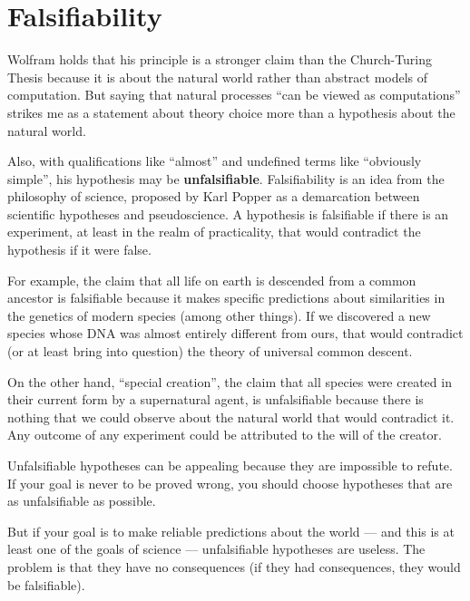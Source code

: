 \documentclass[12pt]{book}
\theoremstyle{exercise}
\begin{document}


\section{Falsifiability}

Wolfram holds that his principle is a stronger claim than the
Church-Turing Thesis because it is about the natural world rather
than abstract models of computation.  But saying that natural processes
``can be viewed as computations'' strikes me as a statement about
theory choice more than a hypothesis about the natural world.


Also, with qualifications like
``almost'' and undefined terms like ``obviously simple'', his
hypothesis may be {\bf unfalsifiable}.  Falsifiability is
an idea from the philosophy of science, proposed by Karl Popper
as a demarcation between scientific hypotheses and pseudoscience.
A hypothesis is falsifiable if there is an experiment, at least
in the realm of practicality, that would contradict the hypothesis
if it were false.


For example, the claim that all life on earth is descended
from a common ancestor is falsifiable because it makes specific
predictions about similarities in the genetics of modern species
(among other things).  If we discovered a new species whose
DNA was almost entirely different from ours, that would
contradict (or at least bring into question) the theory of
universal common descent.


On the other hand, ``special creation'', the claim that all species
were created in their current form by a supernatural agent, is
unfalsifiable because there is nothing that we could observe about the
natural world that would contradict it.  Any outcome of any experiment
could be attributed to the will of the creator.


Unfalsifiable hypotheses can be appealing because
they are impossible to refute.  If your goal is never to be
proved wrong, you should choose hypotheses that are as
unfalsifiable as possible.

But if your goal is to make reliable predictions about the world --- and
this is at least one of the goals of science --- unfalsifiable
hypotheses are useless.  The problem is that they have
no consequences (if they had consequences, they would be
falsifiable).
\end{document}
